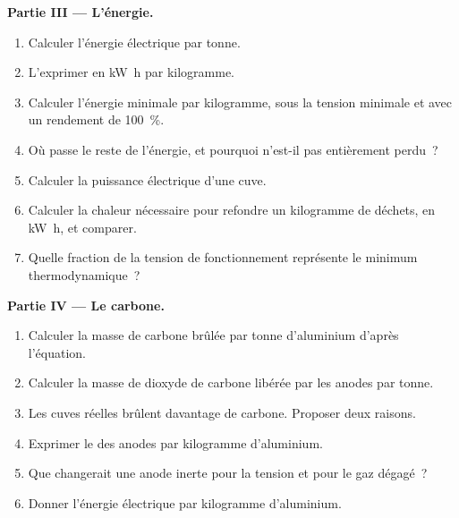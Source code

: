 \begin{problem}
\medskip
\noindent\textbf{Partie III --- L'énergie.}
\begin{enumerate}[resume]
  \item Calculer l'énergie électrique par tonne.
  \item L'exprimer en \unit{kW.h} par kilogramme.
  \item Calculer l'énergie minimale par kilogramme, sous la tension minimale et avec un
        rendement de 100~\%.
  \item Où passe le reste de l'énergie, et pourquoi n'est-il pas entièrement
        perdu~?
  \item Calculer la puissance électrique d'une cuve.
  \item Calculer la chaleur nécessaire pour refondre un kilogramme de déchets, en
        \unit{kW.h}, et comparer.
  \item Quelle fraction de la tension de fonctionnement représente le minimum thermodynamique~?
\end{enumerate}

\medskip
\noindent\textbf{Partie IV --- Le carbone.}
\begin{enumerate}[resume]
  \item Calculer la masse de carbone brûlée par tonne d'aluminium d'après
        l'équation.
  \item Calculer la masse de dioxyde de carbone libérée par les anodes par tonne.
  \item Les cuves réelles brûlent davantage de carbone. Proposer deux raisons.
  \item Exprimer le  des anodes par kilogramme d'aluminium.
  \item Que changerait une anode inerte pour la tension et pour le gaz
        dégagé~?
  \item Donner l'énergie électrique par kilogramme d'aluminium.
\end{enumerate}
\end{problem}
